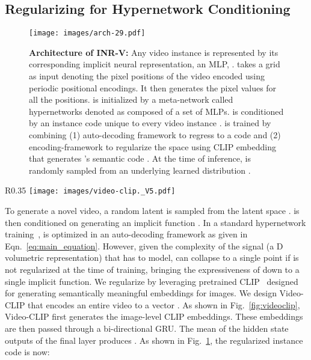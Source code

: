 \documentclass[10pt]{article} \usepackage[accepted]{tmlr}
\begin{document}
\subsection{Regularizing  for Hypernetwork Conditioning}
\begin{figure}
  \centering
  \texttt{[image: images/arch-29.pdf]}
  \caption{\textbf{Architecture of INR-V: }Any video instance  is represented by its corresponding implicit neural representation, an MLP, .  takes a grid as input denoting the pixel positions of the video encoded using periodic positional encodings. It then generates the pixel values for all the positions.  is initialized by a meta-network called hypernetworks denoted as  composed of a set of MLPs.  is conditioned by an instance code  unique to every video instance .  is trained by combining (1) auto-decoding framework to regress to a code  and (2) encoding-framework to regularize the space using CLIP embedding that generates  's semantic code . At the time of inference,  is randomly sampled from an underlying learned distribution .}
  \label{fig:arch}
\end{figure}

\begin{wrapfigure}[17]{R}{0.35\textwidth}
\centering
\vspace{-15pt}
\texttt{[image: images/video-clip.\_V5.pdf]}
\caption{\textbf{Video-CLIP}: Encoding a video  to a latent vector  by using image-level CLIP encodings.}
\label{fig:videoclip}
\end{wrapfigure}
To generate a novel video, a random latent  is sampled from the latent space .  is then conditioned on  generating an implicit function . 
In a standard hypernetwork training~\cite{3dhypernet2, lfns, deepsdf, siren},  is optimized in an auto-decoding framework as given in Eqn.~\ref{eq:main_equation}. However, given the complexity of the signal  (a D volumetric representation) that  has to model,  can collapse to a single point if  is not regularized at the time of training, bringing the expressiveness of  down to a single implicit function. 
We regularize  by 
leveraging pretrained CLIP~\cite{clip} designed for generating semantically meaningful embeddings for images. We design Video-CLIP that encodes an entire video  to a vector .
As shown in Fig.~\ref{fig:videoclip}, Video-CLIP first generates the image-level CLIP embeddings. These embeddings are then passed through a bi-directional GRU. The mean of the hidden state outputs of the final layer produces . As shown in Fig.~\ref{fig:arch}, the regularized instance code  is now:
\end{document}

